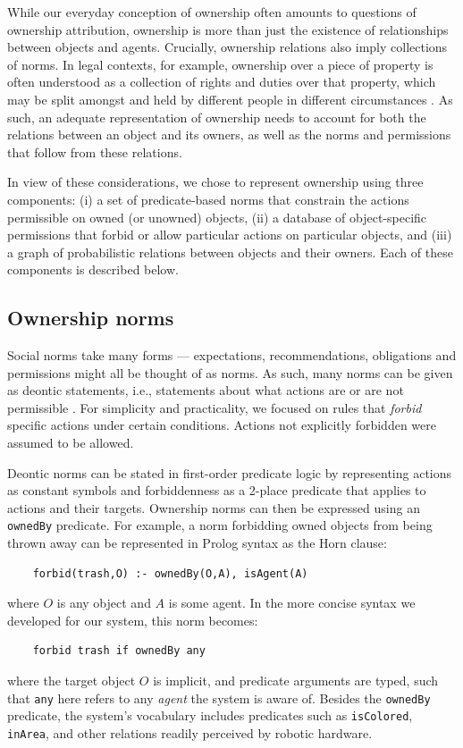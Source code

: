 \documentclass[letterpaper]{article} %
\begin{document}
While our everyday conception of ownership often amounts to questions of ownership attribution, ownership is more than just the existence of relationships between objects and agents. Crucially, ownership relations also imply collections of norms. In legal contexts, for example, ownership over a piece of property is often understood as a collection of rights and duties over that property, which may be split amongst and held by different people in different circumstances \cite{mccarty2002ownership}. As such, an adequate representation of ownership needs to account for both the relations between an object and its owners, as well as the norms and permissions that follow from these relations.

In view of these considerations, we chose to represent ownership using three components: (i) a set of predicate-based norms that constrain the actions permissible on owned (or unowned) objects, (ii) a database of object-specific permissions that forbid or allow particular actions on particular objects, and (iii) a graph of probabilistic relations between objects and their owners. Each of these components is described below.

\subsection{Ownership norms}

Social norms take many forms --- expectations, recommendations, obligations and permissions might all be thought of as norms. As such, many norms can be given as deontic statements, i.e., statements about what actions are or are not permissible \cite{malle2017networks}. For simplicity and practicality, we focused on rules that \emph{forbid} specific actions under certain conditions. Actions not explicitly forbidden were assumed to be allowed.

Deontic norms can be stated in first-order predicate logic by representing actions as constant symbols and forbiddenness as a 2-place predicate that applies to actions and their targets. Ownership norms can then be expressed using an \texttt{\small{ownedBy}} predicate. For example, a norm forbidding owned objects from being thrown away can be represented in Prolog syntax as the Horn clause: 
\begin{scriptsize}
\begin{verbatim}
    forbid(trash,O) :- ownedBy(O,A), isAgent(A)
\end{verbatim}
\end{scriptsize}
where $O$ is any object and $A$ is some agent. In the more concise syntax we developed for our system, this norm becomes:
\begin{scriptsize}
\begin{verbatim}
    forbid trash if ownedBy any
\end{verbatim}
\end{scriptsize}
where the target object $O$ is implicit, and predicate arguments are typed, such that \texttt{\small{any}} here refers to any \emph{agent} the system is aware of. Besides the \texttt{\small{ownedBy}} predicate, the system's vocabulary includes predicates such as \texttt{\small{isColored}}, \texttt{\small{inArea}}, and other relations readily perceived by robotic hardware.
\end{document}
